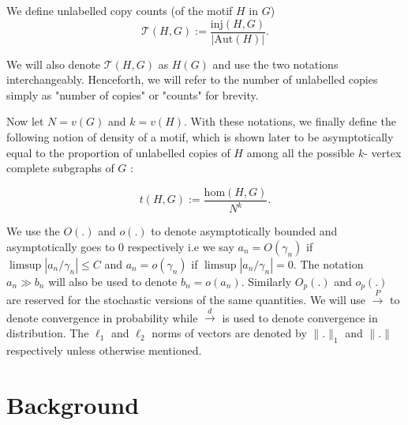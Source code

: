 \documentclass[12pt]{article}
\newcommand{\homc}{\mathrm{hom}}
\newcommand{\injc}{\mathrm{inj}}
\newcommand{\Aut}{\mathrm{Aut}}
\numberwithin{equation}{section}
\begin{document}
We define unlabelled copy counts (of the motif $H$ in $G$)
\[
\mathcal{T}(H, G):=\frac{\injc(H,G)}{|\Aut(H)|}.
\]

We will also denote $\mathcal{T}(H, G)$ as 
 $H(G)$ and use the two notations interchangeably. Henceforth, we will refer to the number of unlabelled copies simply as "number of copies" or "counts" for brevity.


Now let \(N=v(G)\) and \(k=v(H)\). With these notations, we finally define the following notion of density of a motif, which is shown later to be asymptotically equal to the proportion of unlabelled copies of $H$ among all the possible $k$- vertex complete subgraphs of $G$ :

\[
t(H,G) := \frac{\homc(H,G)}{N^k}.
\]

We use the $O(.)$ and $o(.)$ to denote asymptotically bounded and asymptotically goes to $0$ respectively i.e we say $a_n=O(\gamma_n)$ if $\limsup|a_n/\gamma_n|\leq C$ and $a_n=o(\gamma_n)$ if $\limsup|a_n/\gamma_n|=0$. The notation $a_n\gg b_n$ will also be used to denote $b_n=o(a_n)$. Similarly $O_p(.)$ and $o_p(.)$ are reserved for the stochastic versions of the same quantities. We will use $\xrightarrow{P}$ to denote convergence in probability while $\xrightarrow{d}$ is used to denote convergence in distribution. The $\ell_1$ and $\ell_2$ norms of vectors are denoted by $\|.\|_1$ and $\|.\|$ respectively unless otherwise mentioned.




\section{Background \label{background}}
\end{document}
